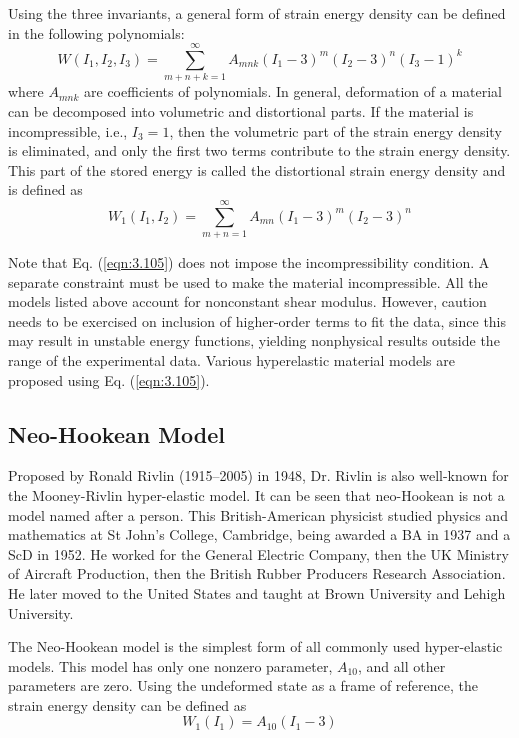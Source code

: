Using the three invariants, a general form of strain energy density can be defined in the following polynomials:
\begin{equation}
\label{eqn:3.104}
 W\left(I_{1}, I_{2}, I_{3}\right)=\sum_{m+n+k=1}^{\infty} A_{m n k}\left(I_{1}-3\right)^{m}\left(I_{2}-3\right)^{n}\left(I_{3}-1\right)^{k} 
\end{equation}
where $ A_{m n k} $ are coefficients of polynomials. In general, deformation of a material can be decomposed into volumetric and distortional parts. If the material is incompressible, i.e., $ I_{3}=1 $, then the volumetric part of the strain energy density is eliminated, and only the first two terms contribute to the strain energy density. This part of the stored energy is called the distortional strain energy density and is defined as
\begin{equation}
\label{eqn:3.105}
W_{1}\left(I_{1}, I_{2}\right)=\sum_{m+n=1}^{\infty} A_{m n}\left(I_{1}-3\right)^{m}\left(I_{2}-3\right)^{n}
\end{equation}

Note that Eq. (\ref{eqn:3.105}) does not impose the incompressibility condition. A separate constraint must be used to make the material incompressible. All the models listed above account for nonconstant shear modulus. However, caution needs to be exercised on inclusion of higher-order terms to fit the data, since this may result in unstable energy functions, yielding nonphysical results outside the range of the experimental data. Various hyperelastic material models are proposed using Eq. (\ref{eqn:3.105}). 
\subsection{Neo-Hookean Model }
Proposed by Ronald Rivlin (1915–2005) in 1948, Dr. Rivlin is also well-known for the Mooney-Rivlin hyper-elastic model. It can be seen that neo-Hookean is not a model named after a person. This British-American physicist studied physics and mathematics at St John’s College, Cambridge, being awarded a BA in 1937 and a ScD in 1952. He worked for the General Electric Company, then the UK Ministry of Aircraft Production, then the British Rubber Producers Research Association. He later moved to the United States and taught at Brown University and Lehigh University.

The Neo-Hookean model is the simplest form of all commonly used hyper-elastic models. This model has only one nonzero parameter, $ A_{10} $, and all other parameters are zero. Using the undeformed state as a frame of reference, the strain energy density can be defined as
\begin{equation}
\label{eqn:3.106}
 W_{1}\left(I_{1}\right)=A_{10}\left(I_{1}-3\right) 
\end{equation}

